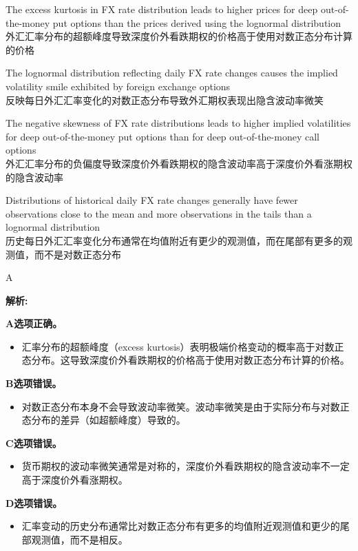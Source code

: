 \documentclass{article}
\newenvironment{explanation}
{\textbf{解析:}\par}
{\par}
\begin{document}
\begin{choices}
    \item The excess kurtosis in FX rate distribution leads to higher prices for deep out-of-the-money put options than the prices derived using the lognormal distribution
    \\ 外汇汇率分布的超额峰度导致深度价外看跌期权的价格高于使用对数正态分布计算的价格
    \item The lognormal distribution reflecting daily FX rate changes causes the implied volatility smile exhibited by foreign exchange options
    \\ 反映每日外汇汇率变化的对数正态分布导致外汇期权表现出隐含波动率微笑
    \item The negative skewness of FX rate distributions leads to higher implied volatilities for deep out-of-the-money put options than for deep out-of-the-money call options
    \\ 外汇汇率分布的负偏度导致深度价外看跌期权的隐含波动率高于深度价外看涨期权的隐含波动率
    \item Distributions of historical daily FX rate changes generally have fewer observations close to the mean and more observations in the tails than a lognormal distribution
    \\ 历史每日外汇汇率变化分布通常在均值附近有更少的观测值，而在尾部有更多的观测值，而不是对数正态分布
\end{choices}

\begin{correctanswer}
    A
\end{correctanswer}

\begin{explanation}
    \textbf{A选项正确。}
    \begin{itemize}
        \item 汇率分布的超额峰度（excess kurtosis）表明极端价格变动的概率高于对数正态分布。这导致深度价外看跌期权的价格高于使用对数正态分布计算的价格。
    \end{itemize}
    
    \textbf{B选项错误。}
    \begin{itemize}
        \item 对数正态分布本身不会导致波动率微笑。波动率微笑是由于实际分布与对数正态分布的差异（如超额峰度）导致的。
    \end{itemize}
    
    \textbf{C选项错误。}
    \begin{itemize}
        \item 货币期权的波动率微笑通常是对称的，深度价外看跌期权的隐含波动率不一定高于深度价外看涨期权。
    \end{itemize}
    
    \textbf{D选项错误。}
    \begin{itemize}
        \item 汇率变动的历史分布通常比对数正态分布有更多的均值附近观测值和更少的尾部观测值，而不是相反。
    \end{itemize}
\end{explanation}
\end{document}

